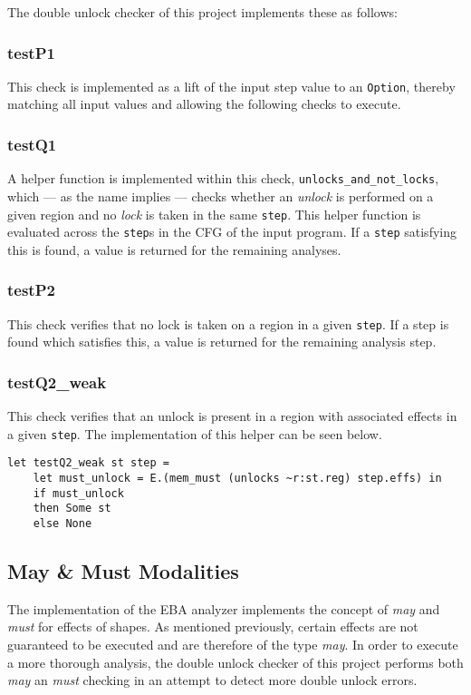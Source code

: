 \newpar The double unlock checker of this project implements these as follows: 

\subsubsection{testP1}
This check is implemented as a lift of the input step value to an \texttt{Option}, thereby matching all input values and allowing the following checks to execute.

\subsubsection{testQ1}
A helper function is implemented within this check, \texttt{unlocks\_and\_not\_locks}, which --- as the name implies --- checks whether an \textit{unlock} is performed on a given region and no \textit{lock} is taken in the same \texttt{step}. This helper function is evaluated across the \texttt{step}s in the CFG of the input program. If a \texttt{step} satisfying this is found, a value is returned for the remaining analyses. 

\subsubsection{testP2}
This check verifies that no lock is taken on a region in a given \texttt{step}. If a step is found which satisfies this, a value is returned for the remaining analysis step. 

\subsubsection{testQ2\_weak}
This check verifies that an unlock is present in a region with associated effects in a given \texttt{step}. The implementation of this helper can be seen below. 

\begin{verbatim}
let testQ2_weak st step =
    let must_unlock = E.(mem_must (unlocks ~r:st.reg) step.effs) in
    if must_unlock
    then Some st
    else None
\end{verbatim}

\subsection{May \& Must Modalities}
\newpar The implementation of the EBA analyzer implements the concept of \textit{may} and \textit{must} for effects of shapes. As mentioned previously, certain effects are not guaranteed to be executed and are therefore of the type \textit{may}. In order to execute a more thorough analysis, the double unlock checker of this project performs both \textit{may} an \textit{must} checking in an attempt to detect more double unlock errors. 

